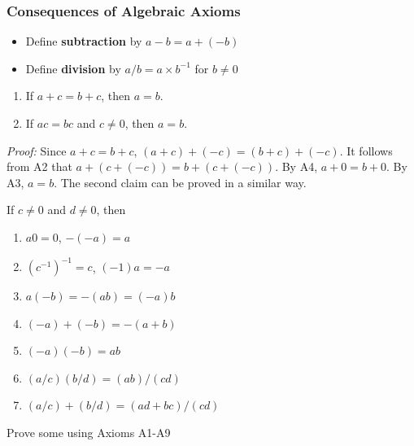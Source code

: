 \documentclass[9pt,aspectratio=169]{beamer}
\begin{document}
\begin{frame}[allowframebreaks]
    \frametitle{Consequences of Algebraic Axioms}
    \begin{definition}
        \begin{itemize}
            \item Define \textbf{subtraction} by $a - b = a + (-b)$
            \item Define \textbf{division} by $a/b = a \times b^{-1}$ for $b
            \neq 0$
        \end{itemize}
        
    \end{definition}
    \begin{theorem}
        \begin{enumerate}
            \item If $a + c = b + c$, then $a = b$.
            \item If $ac = bc$ and $c \neq 0$, then $a = b$.
        \end{enumerate}
    \end{theorem}
    \emph{Proof:} Since $a + c = b + c$, $(a + c) + (-c) = (b + c) + (-c)$.
    It follows from A2 that $a + (c + (-c)) = b + (c + (-c))$. By A4, $a + 0
    = b + 0$. By A3, $a = b$. The second claim can be proved in a similar
    way.

    \framebreak
    \begin{theorem}
        If $c\neq 0$ and $d \neq 0$, then
        \begin{enumerate}
            \item $a 0 = 0$, $- (-a) = a$
            \item $(c^{-1})^{-1} = c$, $(-1) a = -a$
            \item $a(-b) = -(ab) = (-a)b$
            \item $(-a) + (-b) = -(a + b)$
            \item $(-a) (-b) = ab$
            \item $(a/c) (b/d) = (ab)/(cd)$
            \item $(a/c) + (b/d) = (ad + bc)/(cd)$
        \end{enumerate}
    \end{theorem}
    Prove some using Axioms A1-A9
\end{frame}
\end{document}

